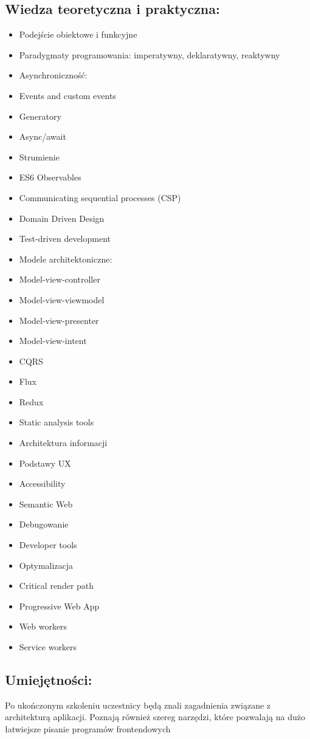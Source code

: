 \documentclass{article}[10pt]
\begin{document}
	\subsection*{Wiedza teoretyczna i praktyczna:}
\begin{adjustwidth}{1.5cm}{}
	\begin{itemize}
		\item Podejście obiektowe i funkcyjne
		\item Paradygmaty programowania: imperatywny, deklaratywny, reaktywny
		\item Asynchroniczność:
		\item Events and custom events
		\item Generatory
		\item Async/await
		\item Strumienie
		\item ES6 Observables
		\item Communicating sequential processes (CSP)
		\item Domain Driven Design
		\item Test-driven development
		\item Modele architektoniczne:
		\item Model-view-controller
		\item Model-view-viewmodel
		\item Model-view-presenter
		\item Model-view-intent
		\item CQRS
		\item Flux
		\item Redux
		\item Static analysis tools
		\item Architektura informacji
		\item Podstawy UX
		\item Accessibility
		\item Semantic Web
		\item Debugowanie
		\item Developer tools
		\item Optymalizacja
		\item Critical render path
		\item Progressive Web App
		\item Web workers
		\item Service workers
	\end{itemize}
\end{adjustwidth}

	\subsection*{Umiejętności:}
\begin{adjustwidth}{2cm}{}
\justifying
	
Po ukończonym szkoleniu uczestnicy będą znali zagadnienia związane z architekturą aplikacji. Poznają również szereg narzędzi, które pozwalają na dużo łatwiejsze pisanie programów frontendowych 


\end{adjustwidth}
\end{document}
